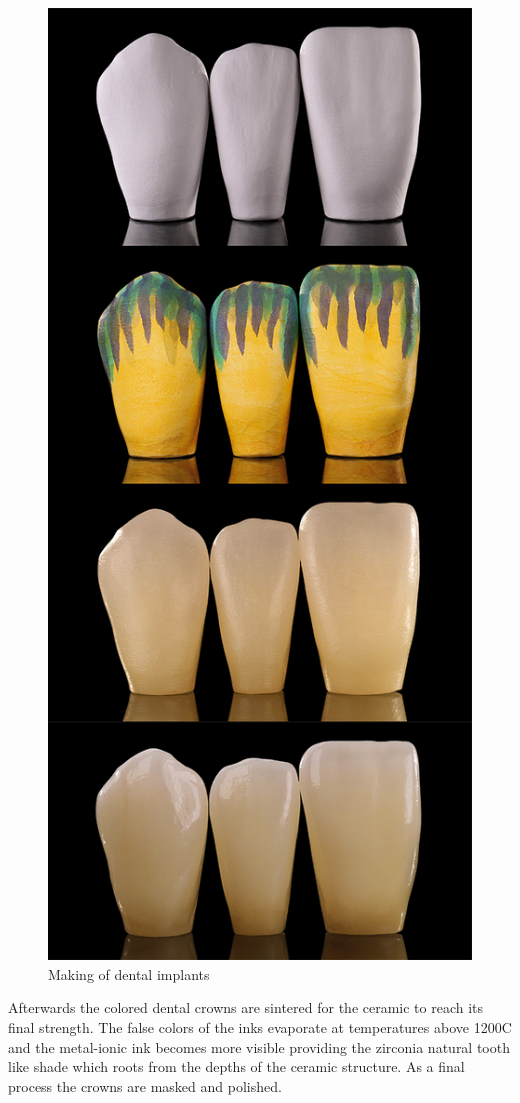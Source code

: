 \bigskip
\begin{figure}[h]
	\centering
	\includegraphics[height=0.6\textwidth]{grafiken/CrownProcesses.jpg}
	\caption{Making of dental implants \citep{zirkonzahn2018} }
	\label{fig:CrownProcesses}
\end{figure} 
 \bigskip

Afterwards the colored dental crowns are sintered for the ceramic to reach its final strength. The false colors of the inks evaporate at temperatures above 1200\textdegree C and the metal-ionic ink becomes more visible providing the zirconia natural tooth like shade which roots from the depths of the ceramic structure. As a final process the crowns are masked and polished.



